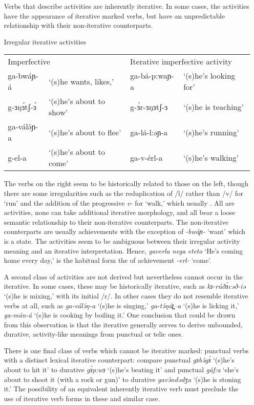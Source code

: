 Verbs that describe activities are inherently iterative. In some cases, the activities have the appearance of iterative marked verbs, but have an unpredictable relationship with their non-iterative counterparts.

\ea Irregular iterative activities\\
\begin{tabular}[t]{llll}
\multicolumn{2}{l}{Imperfective}  & \multicolumn{2}{l}{Iterative imperfective activity} \\
{ga-bwáɲ-á} & `(s)he wants, likes,' &  {ga-bá-p:waɲ-a} & `(s)he's looking for' \\
{g-ɜŋɜ́tʃ-ɜ́} & `(s)he's about to show' &  g-ɜ́r-ɜŋɜtʃ-ɜ  & `(s)he is teaching' \\
{ga-válə́ɲ-a} & `(s)he's about to flee' &  {ga-lá-l:əɲ-a} & `(s)he's running' \\
{g-el-a} & `(s)he's about to come' &  {ga-v-érl-a} & `(s)he's walking' \\
\end{tabular}
\z  
The verbs on the right seem to be historically related to those on the left, though there are some irregularities such as the reduplication of /l/ rather than /v/ for `run' and the addition of the progressive \textit{v-} for `walk,' which usually . All are activities, none can take additional iterative morphology, and all bear a loose semantic relationship to their non-iterative counterparts. The non-iterative counterparts are usually achievements with the exception of \textit{-bwáɲ-} `want' which is a state. The activities seem to be ambiguous between their irregular activity meaning and an iterative interpretation. Hence, \textit{gaverla nega eteto} `He's coming home every day,' is the habitual form the of achievement \textit{-erl-} `come'.  

A second class of activities are not derived but nevertheless cannot occur in the iterative. In some cases, these may be historically iterative, such as \textit{kɜ-rúðɜ́cəð-iə} `(s)he is  mixing,' with its initial /r/. In other cases they do not resemble iterative verbs at all, such as \textit{ga-válə́ŋ-a} `(s)he is singing,'  \textit{ga-tə́ŋát̪--a} `(s)he is licking it,' \textit{ga-mán-á} `(s)he is cooking by boiling it.' One conclusion that could be drawn from this observation is that the iterative generally serves to derive unbounded, durative, activity-like meanings from punctual or telic ones.

There is one final class of verbs which cannot be iterative marked: punctual verbs with a distinct lexical iterative counterpart: compare punctual \textit{gɜbə́gɜ́} `(s)he's about to hit it' to durative \textit{gɜ́p:wɜ}  `(s)he's beating it' and punctual \textit{gáf:a} `she's about to shoot it (with a rock or gun)' to durative \textit{gavə́ndədʒa} `(s)he is stoning it.' The possibility of an equivalent inherently iterative verb must preclude the use of iterative verb forms in these and similar case.

